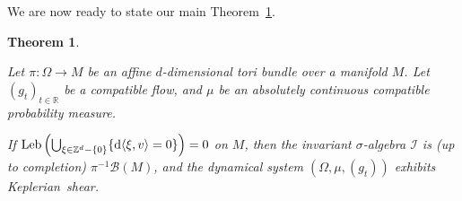 \documentclass[10pt]{amsart}
\newtheorem{theo}{Theorem}[section]
\theoremstyle{definition}\newtheorem{defi}[theo]{Definition}\newtheorem{rema}[theo]{Remark}\newtheorem{exam}[theo]{Example}\newtheorem{exem}[theo]{Example}\newtheorem{nota}[theo]{Notation}
\DeclareMathOperator{\Leb}{Leb}
\newcommand{\Z}{\mathbb{Z}}
\newcommand{\R}{\mathbb{R}}
\newcommand{\Bcal}{\mathcal{B}}
\newcommand{\Ical}{\mathcal{I}}
\newcommand{\de}{{\rm d}}
\begin{document}
We are now ready to state our main Theorem~\ref{thm:ClassiquePrincipal}.

\begin{theo}\label{thm:ClassiquePrincipal}

Let $\pi: \Omega \to M$ be an affine $d$-dimensional tori bundle over a manifold $M$. Let $(g_t)_{t \in \R}$ be a compatible flow, and $\mu$ be an absolutely continuous compatible probability measure.


If $\Leb \left(\bigcup_{\xi \in \Z^d - \{0\}} \{ \de \langle \xi, v \rangle = 0\}\right) = 0$ on $M$, then the invariant $\sigma$-algebra $\Ical$ is (up to completion) $\pi^{-1} \Bcal (M)$, and the dynamical system $(\Omega, \mu, (g_t))$ exhibits Keplerian~shear.
\end{theo}
\end{document}
